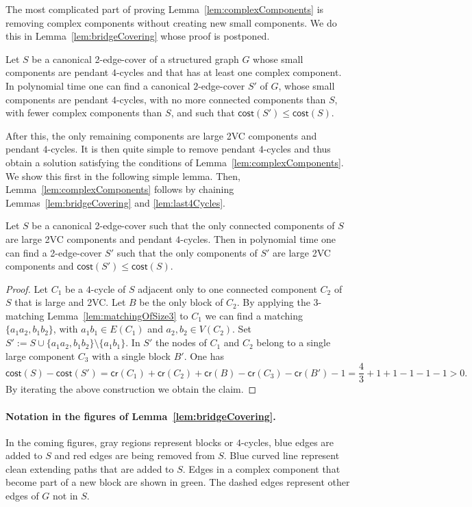 \documentclass{theoretics}
\newcommand{\cost}{\mathsf{cost}}
\newcommand{\credit}{\mathsf{cr}}
\begin{document}
The most complicated part of proving Lemma~\ref{lem:complexComponents} is removing complex components without creating new small components. We do this in Lemma~\ref{lem:bridgeCovering} whose proof is postponed. 
\begin{lemma}\label{lem:bridgeCovering}
    Let $S$ be a canonical 2-edge-cover of a structured graph $G$ whose small components are pendant $4$-cycles and that has at least one complex component. In polynomial time one can find a canonical $2$-edge-cover $S'$ of $G$, whose small components are pendant $4$-cycles, with no more connected components than $S$, with fewer complex components than $S$, and such that $\cost(S')\leq \cost(S)$.
\end{lemma}
After this, the only remaining components are large 2VC components and pendant $4$-cycles. It is then quite simple to remove pendant $4$-cycles and thus obtain a solution satisfying the conditions of Lemma~\ref{lem:complexComponents}. We show this first in the following simple lemma. Then, Lemma~\ref{lem:complexComponents} follows by chaining Lemmas~\ref{lem:bridgeCovering} and \ref{lem:last4Cycles}.

\begin{lemma}\label{lem:last4Cycles}
    Let $S$ be a canonical 2-edge-cover such that the only connected components of $S$ are large 2VC components and pendant $4$-cycles. Then in polynomial time one can find a 2-edge-cover $S'$ such that the only components of $S'$ are large 2VC components and $\cost(S')\leq \cost(S)$.
\end{lemma}
\begin{proof}
    Let $C_1$ be a $4$-cycle of $S$ adjacent only to one connected component $C_2$ of $S$ that is large and 2VC. Let $B$ be the only block of $C_2$. By applying the 3-matching Lemma~\ref{lem:matchingOfSize3} to $C_1$ we can find a matching $\{a_1a_2, b_1b_2\}$, with $a_1b_1\in E(C_1)$ and $a_2,b_2\in V(C_2)$. Set $S':=S\cup\{a_1a_2, b_1b_2\}\setminus\{a_1b_1\}$. In $S'$ the nodes of $C_1$ and $C_2$ belong to a single large component $C_3$ with a single block $B'$. One has 
    $$
    \cost(S)-\cost(S')=\credit(C_1)+\credit(C_2)+\credit(B)-\credit(C_3)-\credit(B')-1=\frac43+1+1-1-1-1>0.   
    $$
    By iterating the above construction we obtain the claim.
\end{proof}

\paragraph{Notation in the figures of Lemma~\ref{lem:bridgeCovering}.} In the coming figures, gray regions represent blocks or $4$-cycles, blue edges are added to $S$ and red edges are being removed from $S$. Blue curved line represent clean extending paths that are added to $S$. Edges in a complex component that become part of a new block are shown in green. The dashed edges represent other edges of $G$ not in $S$.
\end{document}
